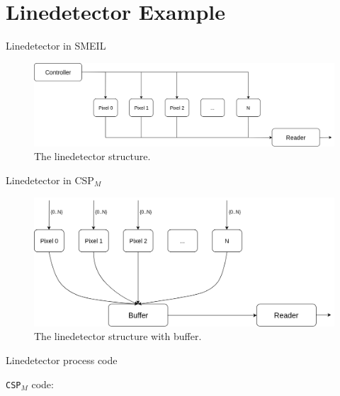 \documentclass[11pt]{beamer}
\newcommand{\cspm}{CSP$_M$}
\begin{document}
\section{Linedetector Example}
%
\begin{frame}{Linedetector in SMEIL}
     \begin{figure}[!ht]
          \centering
          \includegraphics[scale=0.25]{figures/Linedetector.png}
          \caption{The linedetector structure.}
     \end{figure}
\end{frame}

\begin{frame}{Linedetector in \cspm{}}
     \begin{figure}[!ht]
          \centering
          \includegraphics[scale=0.25]{figures/Linedetector_buffer.png}
          \caption{The linedetector structure with buffer.}
     \end{figure}
\end{frame}


\begin{frame}{Linedetector process code}
      \begin{block}{}
       \texttt{\cspm{}} code:
         \vspace{5mm}

          \scalebox{0.8}{\usebox{\cspmlinedetectprocesses}}
      \end{block}
\end{frame}
\end{document}
